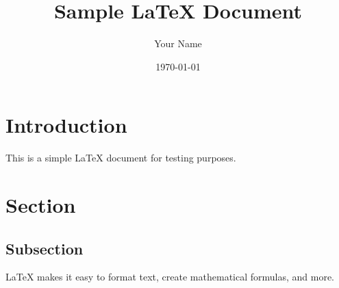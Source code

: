 \documentclass{article}
\begin{document}
\title{Sample LaTeX Document}
\author{Your Name}
\date{\today}

\maketitle

\section{Introduction}

This is a simple LaTeX document for testing purposes.

\section{Section}

\subsection{Subsection}

\LaTeX{} makes it easy to format text, create mathematical formulas, and more.
\end{document}
